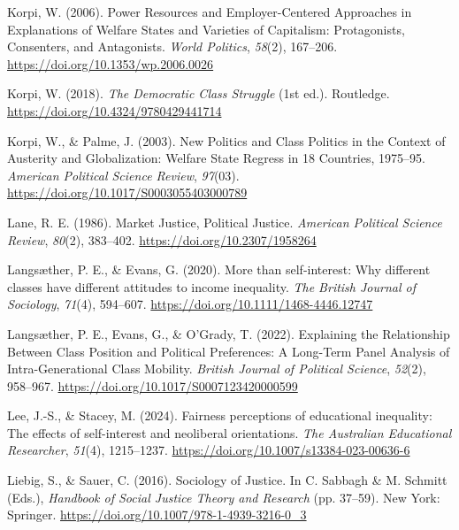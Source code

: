 \documentclass[
  12pt,
]{article}
\newlength{\cslhangindent}
\newenvironment{CSLReferences}[2] %
 {\begin{list}{}{%
  \setlength{\itemindent}{0pt}
  \setlength{\leftmargin}{0pt}
  \setlength{\parsep}{0pt}
  \ifodd #1
   \setlength{\leftmargin}{\cslhangindent}
   \setlength{\itemindent}{-1\cslhangindent}
  \fi
  \setlength{\itemsep}{#2\baselineskip}}}
 {\end{list}}
\begin{document}
\begin{CSLReferences}{1}{0}
Korpi, W. (2006). Power {Resources} and {Employer-Centered Approaches}
in {Explanations} of {Welfare States} and {Varieties} of {Capitalism}:
{Protagonists}, {Consenters}, and {Antagonists}. \emph{World Politics},
\emph{58}(2), 167--206. \url{https://doi.org/10.1353/wp.2006.0026}

Korpi, W. (2018). \emph{The {Democratic Class Struggle}} (1st ed.).
Routledge. \url{https://doi.org/10.4324/9780429441714}

Korpi, W., \& Palme, J. (2003). New {Politics} and {Class Politics} in
the {Context} of {Austerity} and {Globalization}: {Welfare State
Regress} in 18 {Countries}, 1975--95. \emph{American Political Science
Review}, \emph{97}(03). \url{https://doi.org/10.1017/S0003055403000789}

Lane, R. E. (1986). Market {Justice}, {Political Justice}.
\emph{American Political Science Review}, \emph{80}(2), 383--402.
\url{https://doi.org/10.2307/1958264}

Langsæther, P. E., \& Evans, G. (2020). More than self-interest: {Why}
different classes have different attitudes to income inequality.
\emph{The British Journal of Sociology}, \emph{71}(4), 594--607.
\url{https://doi.org/10.1111/1468-4446.12747}

Langsæther, P. E., Evans, G., \& O'Grady, T. (2022). Explaining the
{Relationship Between Class Position} and {Political Preferences}: {A
Long-Term Panel Analysis} of {Intra-Generational Class Mobility}.
\emph{British Journal of Political Science}, \emph{52}(2), 958--967.
\url{https://doi.org/10.1017/S0007123420000599}

Lee, J.-S., \& Stacey, M. (2024). Fairness perceptions of educational
inequality: The effects of self-interest and neoliberal orientations.
\emph{The Australian Educational Researcher}, \emph{51}(4), 1215--1237.
\url{https://doi.org/10.1007/s13384-023-00636-6}

Liebig, S., \& Sauer, C. (2016). Sociology of {Justice}. In C. Sabbagh
\& M. Schmitt (Eds.), \emph{Handbook of {Social Justice Theory} and
{Research}} (pp. 37--59). New York: Springer.
\url{https://doi.org/10.1007/978-1-4939-3216-0_3}


\end{CSLReferences}
\end{document}
